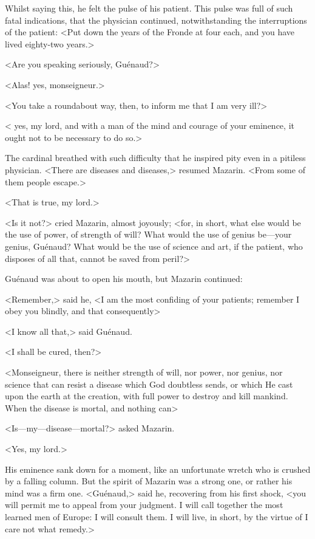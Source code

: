 Whilst saying this, he felt the pulse of his patient. This pulse was full of such fatal indications, that the physician continued, notwithstanding the interruptions of the patient: <Put down the years of the Fronde at four each, and you have lived eighty-two years.>

<Are you speaking seriously, Guénaud?>

<Alas! yes, monseigneur.>

<You take a roundabout way, then, to inform me that I am very ill?>

< yes, my lord, and with a man of the mind and courage of your eminence, it ought not to be necessary to do so.>

The cardinal breathed with such difficulty that he inspired pity even in a pitiless physician. <There are diseases and diseases,> resumed Mazarin. <From some of them people escape.>

<That is true, my lord.>

<Is it not?> cried Mazarin, almost joyously; <for, in short, what else would be the use of power, of strength of will? What would the use of genius be—your genius, Guénaud? What would be the use of science and art, if the patient, who disposes of all that, cannot be saved from peril?>

Guénaud was about to open his mouth, but Mazarin continued:

<Remember,> said he, <I am the most confiding of your patients; remember I obey you blindly, and that consequently\longdash>

<I know all that,> said Guénaud.

<I shall be cured, then?>

<Monseigneur, there is neither strength of will, nor power, nor genius, nor science that can resist a disease which God doubtless sends, or which He cast upon the earth at the creation, with full power to destroy and kill mankind. When the disease is mortal, and nothing can\longdash>

<Is—my—disease—mortal?> asked Mazarin.

<Yes, my lord.>

His eminence sank down for a moment, like an unfortunate wretch who is crushed by a falling column. But the spirit of Mazarin was a strong one, or rather his mind was a firm one. <Guénaud,> said he, recovering from his first shock, <you will permit me to appeal from your judgment. I will call together the most learned men of Europe: I will consult them. I will live, in short, by the virtue of I care not what remedy.>

